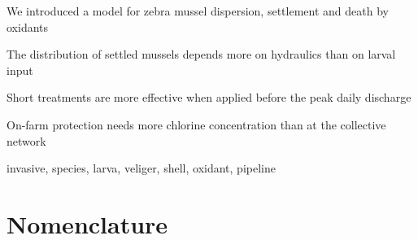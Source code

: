 \documentclass[review,authoryear]{elsarticle}
\begin{document}
\begin{frontmatter}
\begin{highlights}
\item
We introduced a model for zebra mussel dispersion, settlement and death by
oxidants
\item
The distribution of settled mussels depends more on hydraulics than on larval
input
\item
Short treatments are more effective when applied before the peak daily discharge
\item
On-farm protection needs more chlorine concentration than at the collective
network
\end{highlights}

\begin{keyword}
invasive, species, larva, veliger, shell, oxidant, pipeline
\end{keyword}

\end{frontmatter}



\linenumbers

\section*{Nomenclature}
\end{document}
